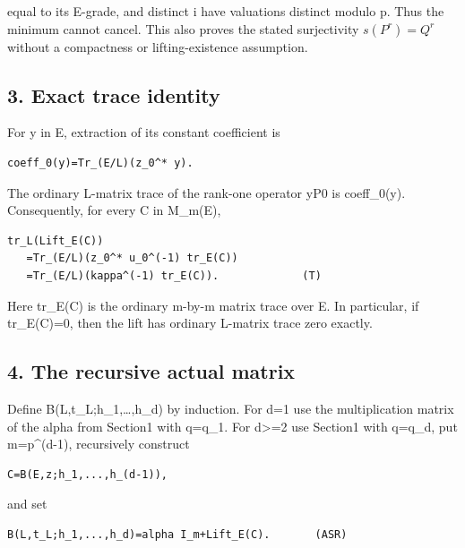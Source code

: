 equal to its E-grade, and distinct i have valuations distinct modulo p.
Thus the minimum cannot cancel. This also proves the stated surjectivity
\(s(P^r)=Q^r\) without a compactness or lifting-existence
assumption.

\hypertarget{odd_tower-exact-trace-identity}{%
\subsection{3. Exact trace identity}\label{odd_tower-exact-trace-identity}}

For y in E, extraction of its constant coefficient is

\begin{Verbatim}[fontsize=\small,breaklines=true,breakanywhere=true]
coeff_0(y)=Tr_(E/L)(z_0^* y).
\end{Verbatim}

The ordinary L-matrix trace of the rank-one operator yP0 is coeff\_0(y).
Consequently, for every C in M\_m(E),

\begin{Verbatim}[fontsize=\small,breaklines=true,breakanywhere=true]
tr_L(Lift_E(C))
   =Tr_(E/L)(z_0^* u_0^(-1) tr_E(C))
   =Tr_(E/L)(kappa^(-1) tr_E(C)).             (T)
\end{Verbatim}

Here tr\_E(C) is the ordinary m-by-m matrix trace over E. In particular,
if tr\_E(C)=0, then the lift has ordinary L-matrix trace zero exactly.

\hypertarget{odd_tower-the-recursive-actual-matrix}{%
\subsection{4. The recursive actual
matrix}\label{odd_tower-the-recursive-actual-matrix}}

Define B(L,t\_L;h\_1,\ldots,h\_d) by induction. For d=1 use the
multiplication matrix of the alpha from Section1 with q=q\_1. For
d\textgreater=2 use Section1 with q=q\_d, put m=p\^{}(d-1), recursively
construct

\begin{Verbatim}[fontsize=\small,breaklines=true,breakanywhere=true]
C=B(E,z;h_1,...,h_(d-1)),
\end{Verbatim}

and set

\begin{Verbatim}[fontsize=\small,breaklines=true,breakanywhere=true]
B(L,t_L;h_1,...,h_d)=alpha I_m+Lift_E(C).       (ASR)
\end{Verbatim}

